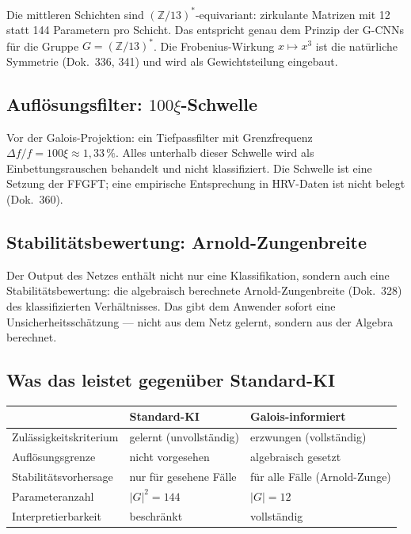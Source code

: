 Die mittleren Schichten sind $(\mathbb{Z}/13)^*$-equivariant: zirkulante
Matrizen mit 12 statt 144 Parametern pro Schicht. Das entspricht genau
dem Prinzip der G-CNNs für die Gruppe $G = (\mathbb{Z}/13)^*$.
Die Frobenius-Wirkung $x\mapsto x^3$ ist die natürliche Symmetrie
(Dok.~336, 341) und wird als Gewichtsteilung eingebaut.

\subsection*{Auflösungsfilter: $100\xi$-Schwelle}

Vor der Galois-Projektion: ein Tiefpassfilter mit Grenzfrequenz
$\Delta f/f = 100\xi \approx 1{,}33\,\%$. Alles unterhalb dieser Schwelle
wird als Einbettungsrauschen behandelt und nicht klassifiziert.
Die Schwelle ist eine Setzung der FFGFT; eine empirische Entsprechung in
HRV-Daten ist nicht belegt (Dok.~360).

\subsection*{Stabilitätsbewertung: Arnold-Zungenbreite}

Der Output des Netzes enthält nicht nur eine Klassifikation, sondern
auch eine Stabilitätsbewertung: die algebraisch berechnete
Arnold-Zungenbreite (Dok.~328) des klassifizierten Verhältnisses.
Das gibt dem Anwender sofort eine Unsicherheitsschätzung --- nicht
aus dem Netz gelernt, sondern aus der Algebra berechnet.

\subsection*{Was das leistet gegenüber Standard-KI}

\begin{center}
\begin{tabular}{@{}lll@{}}
\toprule
& Standard-KI & Galois-informiert \\
\midrule
Zulässigkeitskriterium & gelernt (unvollständig) & erzwungen (vollständig) \\
Auflösungsgrenze & nicht vorgesehen & algebraisch gesetzt \\
Stabilitätsvorhersage & nur für gesehene Fälle & für alle Fälle (Arnold-Zunge) \\
Parameteranzahl & $|G|^2 = 144$ & $|G| = 12$ \\
Interpretierbarkeit & beschränkt & vollständig \\
\bottomrule
\end{tabular}
\end{center}

